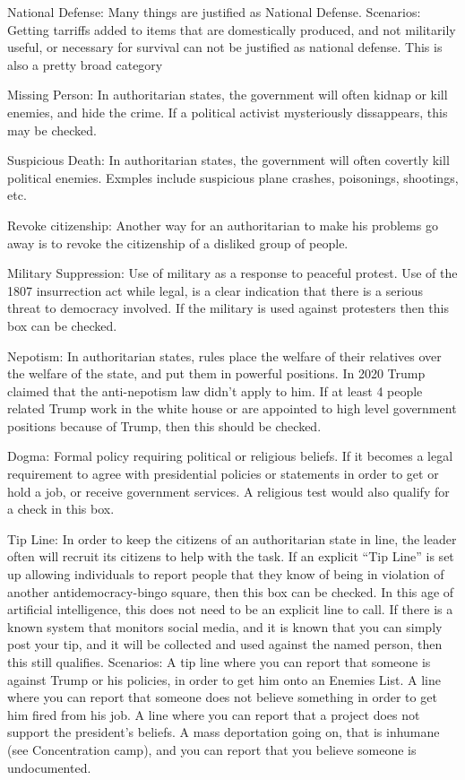 \documentclass{article}
\begin{document}
National Defense: Many things are justified as National Defense.
Scenarios: Getting tarriffs added to items that are domestically produced, and not militarily useful,
or necessary for survival can not be justified as national defense.  This is also a pretty broad
category

Missing Person:  In authoritarian states, the government will often kidnap or kill enemies, and
hide the crime.  If a political activist mysteriously dissappears, this may be checked.

Suspicious Death:  In authoritarian states, the government will often covertly kill political
enemies.  Exmples include suspicious plane crashes, poisonings, shootings, etc.

Revoke citizenship:  Another way for an authoritarian to make his problems go away is to revoke
the citizenship of a disliked group of people.

Military Suppression: Use of military as a response to peaceful protest.  Use of the 1807
insurrection act while legal, is a clear indication that there is a serious threat to
democracy involved.  If the military is used against protesters then this box can be checked.


Nepotism: In authoritarian states, rules place the welfare of their relatives over the
welfare of the state, and put them in powerful positions.  In 2020 Trump claimed that the
anti-nepotism law didn't apply to him.  If at least 4 people related Trump work in the white
house or are appointed to high level government positions because of Trump, then this
should be checked. 

Dogma: Formal policy requiring political or religious beliefs.  If it becomes a legal requirement
to agree with presidential policies or statements in order to get or hold a job, or receive
government services.  A religious test would also qualify for a check in this box.

Tip Line:
In order to keep the citizens of an authoritarian state in line, the leader often will
recruit its citizens to help with the task.  If an explicit ``Tip Line'' is set up allowing
individuals to report people that they know of being in violation of another
antidemocracy-bingo square, then this box can be checked.  In this age of artificial
intelligence, this does not need to be an explicit line to call.  If there is a known
system that monitors social media, and it is known that you can simply post your tip,
and it will be collected and used against the named person, then this still qualifies.
Scenarios:
A tip line where you can report that someone is against Trump or his policies,
in order to get him onto an Enemies List.
A line where you can report that someone does not believe something in order to get
him fired from his job.
A line where you can report that a project does not support the president's beliefs.
A mass deportation going on, that is inhumane (see Concentration camp), and
you can report that you believe someone is undocumented.
\end{document}

